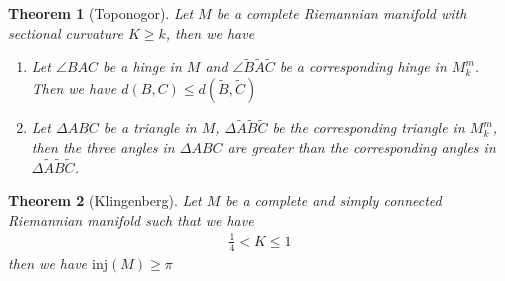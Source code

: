 \documentclass[11pt]{book}
\theoremstyle{break}
\theoremstyle{break}
\newtheorem{thm}{Theorem}[section]
\newcommand{\that}[1]{\widetilde{#1}}
\begin{document}
\begin{thm}[Toponogor]
Let $M$ be a complete Riemannian manifold with sectional curvature $K \geq k$, then we have
\begin{enumerate}
\item Let $\angle BAC$ be a hinge in $M$ and $\angle \that{B} \that{A} \that{C}$ be a corresponding hinge in $M_k^m$. Then we have $d(B,C) \leq d(\that{B}, \that{C})$
\item Let $\Delta ABC$ be a triangle in $M$, $\Delta \that{A} \that{B} \that{C}$ be the corresponding triangle in $M_k^m$, then the three angles in $\Delta ABC$ are greater than the corresponding angles in $\Delta \that{A} \that{B} \that{C}$. 
\end{enumerate}
\end{thm}


\begin{thm}[Klingenberg]
Let $M$ be a complete and simply connected Riemannian manifold such that we have
\begin{align*}
 \frac{1}{4}< K \leq 1
\end{align*}
then we have $\text{inj}(M) \geq \pi$
\end{thm}
\end{document}

